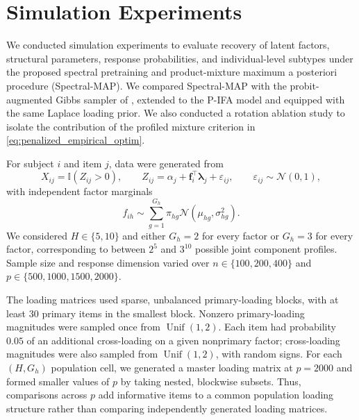 
\section{Simulation Experiments}
\label{sec:simulations}

We conducted simulation experiments to evaluate recovery of latent factors,
structural parameters, response probabilities, and individual-level subtypes
under the proposed spectral pretraining and product-mixture maximum a
posteriori procedure (Spectral-MAP). We compared Spectral-MAP with the
probit-augmented Gibbs sampler of \citet{viroli2007fitting}, extended to the
P-IFA model and equipped with the same Laplace loading prior. We also
conducted a rotation ablation study to isolate the contribution of the
profiled mixture criterion in \eqref{eq:penalized_empirical_optim}.

For subject $i$ and item $j$, data were generated from
\[
X_{ij}=\mathbb{I}(Z_{ij}>0),
\qquad
Z_{ij}=\alpha_j+\boldsymbol f_i^\top\boldsymbol\lambda_j+
\varepsilon_{ij},
\qquad
\varepsilon_{ij}\sim\mathcal{N}(0,1),
\]
with independent factor marginals
\[
f_{ih}\sim\sum_{g=1}^{G_h}\pi_{hg}
\mathcal{N}(\mu_{hg},\sigma_{hg}^2).
\]
We considered $H\in\{5,10\}$ and either $G_h=2$ for every factor or
$G_h=3$ for every factor, corresponding to between $2^5$ and $3^{10}$
possible joint component profiles. Sample size and response dimension varied
over $n\in\{100,200,400\}$ and $p\in\{500,1000,1500,2000\}$.

The loading matrices used sparse, unbalanced primary-loading blocks, with at
least 30 primary items in the smallest block. Nonzero primary-loading
magnitudes were sampled once from $\operatorname{Unif}(1,2)$. Each item had
probability $0.05$ of an additional cross-loading on a given nonprimary
factor; cross-loading magnitudes were also sampled from
$\operatorname{Unif}(1,2)$, with random signs. For each $(H,G_h)$ population
cell, we generated a master loading matrix at $p=2000$ and formed smaller
values of $p$ by taking nested, blockwise subsets. Thus, comparisons across
$p$ add informative items to a common population loading structure rather
than comparing independently generated loading matrices.

